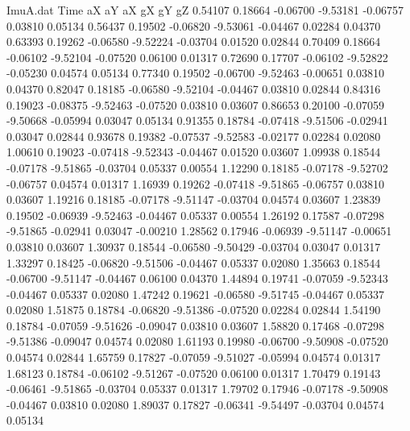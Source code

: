 \begin{filecontents}{ImuA.dat}
Time aX aY aX gX gY gZ
   0.54107    0.18664   -0.06700   -9.53181   -0.06757    0.03810    0.05134
   0.56437    0.19502   -0.06820   -9.53061   -0.04467    0.02284    0.04370
   0.63393    0.19262   -0.06580   -9.52224   -0.03704    0.01520    0.02844
   0.70409    0.18664   -0.06102   -9.52104   -0.07520    0.06100    0.01317
   0.72690    0.17707   -0.06102   -9.52822   -0.05230    0.04574    0.05134
   0.77340    0.19502   -0.06700   -9.52463   -0.00651    0.03810    0.04370
   0.82047    0.18185   -0.06580   -9.52104   -0.04467    0.03810    0.02844
   0.84316    0.19023   -0.08375   -9.52463   -0.07520    0.03810    0.03607
   0.86653    0.20100   -0.07059   -9.50668   -0.05994    0.03047    0.05134
   0.91355    0.18784   -0.07418   -9.51506   -0.02941    0.03047    0.02844
   0.93678    0.19382   -0.07537   -9.52583   -0.02177    0.02284    0.02080
   1.00610    0.19023   -0.07418   -9.52343   -0.04467    0.01520    0.03607
   1.09938    0.18544   -0.07178   -9.51865   -0.03704    0.05337    0.00554
   1.12290    0.18185   -0.07178   -9.52702   -0.06757    0.04574    0.01317
   1.16939    0.19262   -0.07418   -9.51865   -0.06757    0.03810    0.03607
   1.19216    0.18185   -0.07178   -9.51147   -0.03704    0.04574    0.03607
   1.23839    0.19502   -0.06939   -9.52463   -0.04467    0.05337    0.00554
   1.26192    0.17587   -0.07298   -9.51865   -0.02941    0.03047   -0.00210
   1.28562    0.17946   -0.06939   -9.51147   -0.00651    0.03810    0.03607
   1.30937    0.18544   -0.06580   -9.50429   -0.03704    0.03047    0.01317
   1.33297    0.18425   -0.06820   -9.51506   -0.04467    0.05337    0.02080
   1.35663    0.18544   -0.06700   -9.51147   -0.04467    0.06100    0.04370
   1.44894    0.19741   -0.07059   -9.52343   -0.04467    0.05337    0.02080
   1.47242    0.19621   -0.06580   -9.51745   -0.04467    0.05337    0.02080
   1.51875    0.18784   -0.06820   -9.51386   -0.07520    0.02284    0.02844
   1.54190    0.18784   -0.07059   -9.51626   -0.09047    0.03810    0.03607
   1.58820    0.17468   -0.07298   -9.51386   -0.09047    0.04574    0.02080
   1.61193    0.19980   -0.06700   -9.50908   -0.07520    0.04574    0.02844
   1.65759    0.17827   -0.07059   -9.51027   -0.05994    0.04574    0.01317
   1.68123    0.18784   -0.06102   -9.51267   -0.07520    0.06100    0.01317
   1.70479    0.19143   -0.06461   -9.51865   -0.03704    0.05337    0.01317
   1.79702    0.17946   -0.07178   -9.50908   -0.04467    0.03810    0.02080
   1.89037    0.17827   -0.06341   -9.54497   -0.03704    0.04574    0.05134

\end{filecontents}
